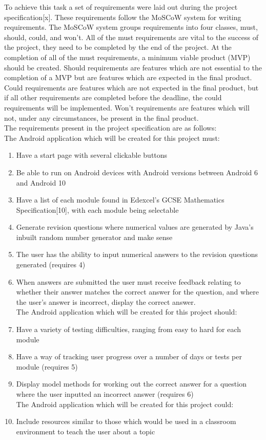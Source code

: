 \documentclass{article}
\begin{document}
To achieve this task a set of requirements were laid out during the project specification[x]. These requirements follow the MoSCoW system for writing requirements. The MoSCoW system groups requirements into four classes, must, should, could, and won't. All of the must requirements are vital to the success of the project, they need to be completed by the end of the project. At the completion of all of the must requirements, a minimum viable product (MVP) should be created. Should requirements are features which are not essential to the completion of a MVP but are features which are expected in the final product. Could requirements are features which are not expected in the final product, but if all other requirements are completed before the deadline, the could requirements will be implemented. Won't requirements are features which will not, under any circumstances, be present in the final product. \\

The requirements present in the project specification are as follows: \\

The Android application which will be created for this project must: 

\begin{enumerate}
	\item Have a start page with several clickable buttons
	\item Be able to run on Android devices with Android versions between Android 6 and Android 10
	\item Have a list of each module found in Edexcel's GCSE Mathematics Specification[10], with each module being selectable
	\item Generate revision questions where numerical values are generated by Java's inbuilt random number generator and make sense
	\item The user has the ability to input numerical answers to the revision questions generated (requires 4)
	\item When answers are submitted the user must receive feedback relating to whether	their answer matches the correct answer for the question, and where the user’s answer is incorrect, display the correct answer. \\
	
	The Android application which will be created for this project should:
	\item Have a variety of testing difficulties, ranging from easy to hard for each module
	\item Have a way of tracking user progress over a number of days or tests per module (requires 5)
	\item Display model methods for working out the correct answer for a question where the user inputted an incorrect answer (requires 6) \\
	
	The Android application which will be created for this project could:
	\item Include resources similar to those which would be used in a classroom environment to teach the user about a topic
\end{enumerate}
\end{document}
